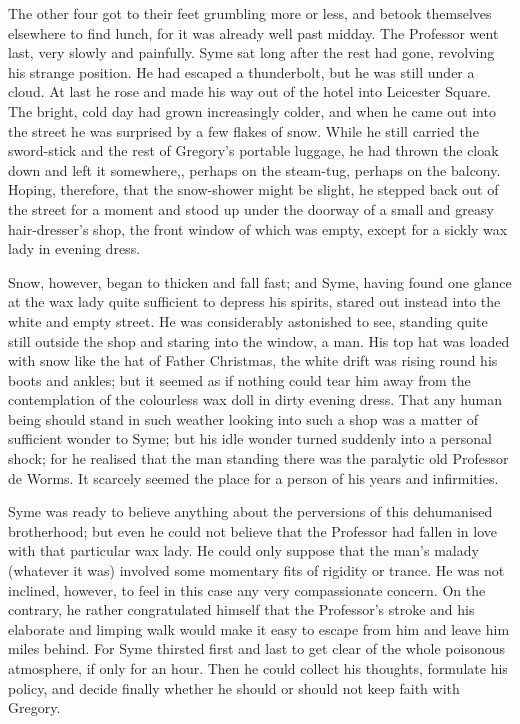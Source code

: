 \documentclass{book}
\begin{document}
The other four got to their feet grumbling more or less, and betook themselves elsewhere to find lunch, for it was already well past midday. The Professor went last, very slowly and painfully. Syme sat long after the rest had gone, revolving his strange position. He had escaped a thunderbolt, but he was still under a cloud. At last he rose and made his way out of the hotel into Leicester Square. The bright, cold day had grown increasingly colder, and when he came out into the street he was surprised by a few flakes of snow. While he still carried the sword-stick and the rest of Gregory’s portable luggage, he had thrown the cloak down and left it somewhere,, perhaps on the steam-tug, perhaps on the balcony. Hoping, therefore, that the snow-shower might be slight, he stepped back out of the street for a moment and stood up under the doorway of a small and greasy hair-dresser’s shop, the front window of which was empty, except for a sickly wax lady in evening dress.

Snow, however, began to thicken and fall fast; and Syme, having found one glance at the wax lady quite sufficient to depress his spirits, stared out instead into the white and empty street. He was considerably astonished to see, standing quite still outside the shop and staring into the window, a man. His top hat was loaded with snow like the hat of Father Christmas, the white drift was rising round his boots and ankles; but it seemed as if nothing could tear him away from the contemplation of the colourless wax doll in dirty evening dress. That any human being should stand in such weather looking into such a shop was a matter of sufficient wonder to Syme; but his idle wonder turned suddenly into a personal shock; for he realised that the man standing there was the paralytic old Professor de Worms. It scarcely seemed the place for a person of his years and infirmities.

Syme was ready to believe anything about the perversions of this dehumanised brotherhood; but even he could not believe that the Professor had fallen in love with that particular wax lady. He could only suppose that the man’s malady (whatever it was) involved some momentary fits of rigidity or trance. He was not inclined, however, to feel in this case any very compassionate concern. On the contrary, he rather congratulated himself that the Professor’s stroke and his elaborate and limping walk would make it easy to escape from him and leave him miles behind. For Syme thirsted first and last to get clear of the whole poisonous atmosphere, if only for an hour. Then he could collect his thoughts, formulate his policy, and decide finally whether he should or should not keep faith with Gregory.
\end{document}
